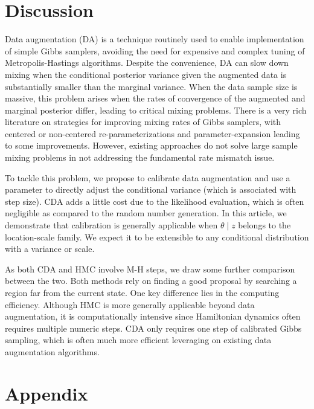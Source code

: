 \documentclass[11pt]{article}
\begin{document}
\section{Discussion}
Data augmentation (DA) is a technique routinely used to enable implementation of simple Gibbs samplers, avoiding the need for expensive and complex tuning of Metropolis-Hastings algorithms.
Despite the convenience, DA can slow down mixing when the conditional posterior variance given the augmented data is substantially smaller than the marginal variance.  When the data sample size is massive, this problem arises when the rates of convergence of the augmented and marginal posterior differ, leading to 
critical mixing problems.  There is a very rich literature on strategies for improving mixing rates of Gibbs samplers, with centered or non-centered re-parameterizations \citep{papaspiliopoulos2007general} and parameter-expansion \citep{liu1999parameter} leading to some improvements.  However, existing approaches {do not} solve large sample mixing problems in not addressing the fundamental rate
mismatch issue.

To tackle this problem, we propose to calibrate data augmentation and use a parameter to directly adjust the conditional variance (which is associated with step size).  CDA adds a little cost due to the likelihood evaluation, which is often negligible as compared to the random number generation. In this article, we demonstrate that calibration is generally applicable when $\theta \mid z$ belongs to the location-scale family. We expect it to be extensible to any conditional distribution with a variance or scale.

As both CDA and HMC involve M-H steps, we draw some further comparison between the two. Both methods rely on finding a good proposal by searching a region far from the current state. One key difference lies in the computing efficiency. Although HMC is more generally applicable beyond data augmentation, it is computationally intensive since Hamiltonian dynamics often requires multiple numeric steps. CDA only requires one step of calibrated Gibbs sampling, which is often much more efficient leveraging on existing data augmentation algorithms.



\appendix
\section{Appendix}
\end{document}
